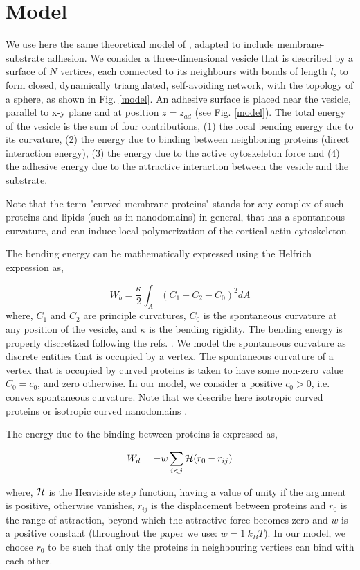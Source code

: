 \documentclass[pre,amsmath]{revtex4}
\begin{document}
\section{Model}
\label{sec:model}
We use here the same theoretical model of \cite{miha2019}, adapted to include membrane-substrate adhesion. We consider a three-dimensional vesicle that is described by a surface of $N$ vertices, each connected to its neighbours with bonds of length $l$, to form closed, dynamically triangulated, self-avoiding network, with the topology of a sphere, as shown in Fig. \ref{model}. An adhesive surface is placed near the vesicle, parallel to x-y plane and at position $z=z_{ad}$ (see Fig. \ref{model}). The total energy of the vesicle is the sum of four contributions, (1) the local bending energy due to its curvature, (2) the energy due to binding between neighboring proteins (direct interaction energy), (3) the energy due to the active cytoskeleton force and (4) the adhesive energy due to the attractive interaction between the vesicle and the substrate. 

Note that the term "curved membrane proteins" stands for any complex of such proteins and lipids (such as in nanodomains) in general, that has a spontaneous curvature, and can induce local polymerization of the cortical actin cytoskeleton.

The bending energy can be mathematically expressed using the Helfrich expression  \cite{helfrich1973} as,

$$W_b=\frac{\kappa}{2} \int_A (C_1 + C_2 - C_0)^2 dA $$
where, $C_1$ and $C_2$ are principle curvatures, $C_0$ is the spontaneous curvature at any position of the vesicle, and $\kappa$ is the bending rigidity. The bending energy is properly discretized  following the refs. \cite{gompper1996,ramakrishnan2011,samo2015}. We model the spontaneous curvature as discrete entities that is occupied by a vertex. The spontaneous curvature of a vertex that is occupied by curved proteins is taken to have some non-zero value $C_0=c_0$, and zero otherwise.  In our model, we consider a positive $c_0>0$, i.e. convex spontaneous curvature. Note that we describe here isotropic curved proteins or isotropic curved nanodomains \cite{kralj_iglic1996,fovsnarivc2006influence}.

The energy due to the binding between proteins is expressed as,

$$W_d = -w\sum_{i<j} {\cal H} (r_0 - r_{ij})$$

where, ${\cal H}$ is the Heaviside step function, having a value of unity if the argument is positive, otherwise vanishes, $r_{ij}$ is the displacement between proteins and $r_0$ is the range of attraction, beyond which the attractive force becomes zero and $w$ is a positive constant (throughout the paper we use: $w=1 ~k_BT$). In our model, we choose $r_0$ to be such that only the proteins in neighbouring vertices can bind with each other.
\end{document}
